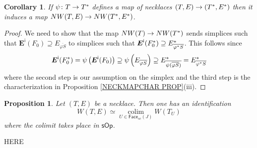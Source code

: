 \documentclass[a4paper,10pt
,draft
]{article}%
\numberwithin{equation}{section}
\numberwithin{figure}{section}
\newtheorem{proposition}[equation]{Proposition}%
\newtheorem{corollary}[equation]{Corollary}%
\theoremstyle{definition} %
\DeclareMathOperator{\colim}{colim}%
\newcommand{\1}{\ensuremath{\mathbbm 1}}%
\begin{document}
\begin{corollary}
	If $\psi \colon T \to T^{\**}$
	defines a map of necklaces
	$(T,E) \to (T^{\**},E^{\**})$
	then 
	it induces a map
	$NW(T,E) \to NW(T^{\**},E^{\**})$.
\end{corollary}


\begin{proof}
	We need to show that the 
	map
	$NW(T) \to NW(T^{\**})$
	sends simplices such that
	$\boldsymbol{E}^{\mathsf{i}}(F_0) \supseteq 
	E_{\overline{\varphi S}}$
	to simplices such that
	$\boldsymbol{E}^{\mathsf{i}}(F^{\**}_0) \supseteq 
	E^{\**}_{\overline{\varphi^{\**} S}}$.
	This follows since
\[
\boldsymbol{E}^{\mathsf{i}}(F^{\**}_0)
	=
\psi \left(\boldsymbol{E}^{\mathsf{i}}(F_0)\right)
	\supseteq
\psi \left( E_{\overline{\varphi S}} \right)
	\supseteq
E^{\**}_{\overline{\psi (\overline{\varphi S})}}
	=
E^{\**}_{\overline{\varphi^{\**} S}}
\]
where the second step is our assumption on the simplex and
the third step is the characterization in 
Proposition \ref{NECKMAPCHAR PROP}(iii).
\end{proof}



\begin{proposition}\label{NECKCOL PROP}
Let $(T,E)$ be a necklace.
Then one has an identification
\begin{equation}\label{NECKCOL EQ}
W(T,E)
\simeq 
\underset{U \in \mathsf{Face}_{sc}(J)}{\colim}
W(T_U)
\end{equation}
where the colimit takes place 
in $\mathsf{sOp}$.
\end{proposition}

{\color{red} HERE}
\end{document}
